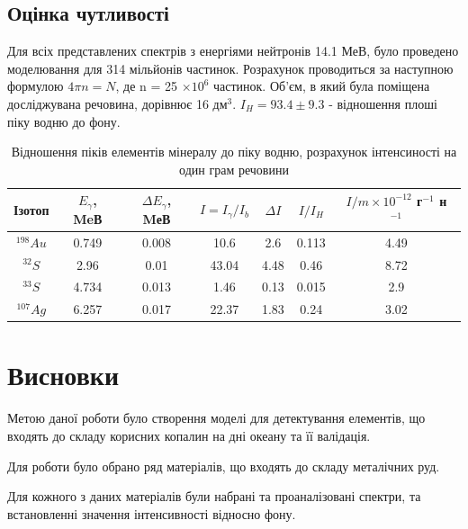 \documentclass[a4paper, 14pt]{article}
\numberwithin{equation}{section}
\numberwithin{table}{section}
\begin{document}
\subsection{Оцінка чутливості}
Для всіх представлених спектрів з енергіями нейтронів 14.1 МеВ, було проведено моделювання для 314 мільйонів частинок. Розрахунок проводиться за наступною формулою $ 4 \pi n = N$, де n = 25 $\times 10^6$ частинок. 
Об'єм, в який була поміщена досліджувана речовина, дорівнює 16 дм$^3$.
$I_H = 93.4 \pm 9.3$ - відношення плоші піку водню до фону.
\begin{table}[h]
	\centering
	\caption{Відношення піків елементів мінералу до піку водню, розрахунок інтенсиності на один грам речовини} 
	\begin{tabular}{|c|c|c|c|c|c|c|} 
		\hline
		Ізотоп & $E_{\gamma}$, MeВ & $\Delta{E_{\gamma}}$, MеВ &  $I = I_{\gamma} / I_{b}$ & $\Delta{I}$ & $I / I_H$ & $I / m \times 10 ^{-12}$ г$^{-1}$ н $^{-1}$ \\
		\hline
		$^{198}Au$&0.749 & 0.008 & 10.6 & 2.6 & 0.113 & 4.49\\
		\hline
		$^{32}S$&2.96 & 0.01 & 43.04 & 4.48 & 0.46 & 8.72\\	
		\hline
		$^{33}S$&4.734 & 0.013 & 1.46 & 0.13 & 0.015 & 2.9\\	
		\hline
		$^{107}Ag$& 6.257 & 0.017 & 22.37 & 1.83 & 0.24 & 3.02\\
		\hline
	\end{tabular}
	\label{tabl:IntensSens}
\end{table}

\newpage 
\section{Висновки}
\setcounter{figure}{0}
Метою даної роботи було створення моделі для детектування елементів, що входять до складу корисних копалин на дні океану та її валідація.
	
Для роботи було обрано ряд матеріалів, що входять до складу металічних руд.

Для кожного з даних матеріалів були набрані та проаналізовані спектри, та встановленні значення інтенсивності відносно фону. 
\end{document}
